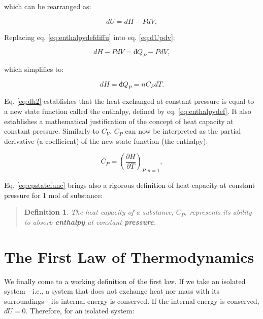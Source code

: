 \documentclass[
  9pt,
]{extbook}
\theoremstyle{definition}
\newtheorem{definition}{Definition}[chapter]
\theoremstyle{definition}
\theoremstyle{definition}
\theoremstyle{remark}
\begin{document}
which can be rearranged as:

\begin{equation}
  dU = dH -PdV,
  \label{eq:enthalpydefdiffu}
\end{equation}

Replacing eq. \eqref{eq:enthalpydefdiffu} into eq. \eqref{eq:dUpdv}:

\begin{equation}
  dH -PdV = đ Q_P - PdV,
  \label{eq:dh1}
\end{equation}

which simplifies to:

\begin{equation}
  dH = đ Q_P = n C_P dT.
  \label{eq:dh2}
\end{equation}

Eq. \eqref{eq:dh2} establishes that the heat exchanged at constant pressure is equal to a new state function called the enthalpy, defined by eq. \eqref{eq:enthalpydef}. It also establishes a mathematical justification of the concept of heat capacity at constant pressure. Similarly to \(C_V\), \(C_P\) can now be interpreted as the partial derivative (a coefficient) of the new state function (the enthalpy):

\begin{equation}
  C_P = \left( \frac{\partial H} {\partial T} \right)_{P,n=1},
  \label{eq:cpstatefunc}
\end{equation}

Eq. \eqref{eq:cpstatefunc} brings also a rigorous definition of heat capacity at constant pressure for 1 mol of substance:

\begin{quote}
\begin{definition}
\protect\hypertarget{def:newdefcp}{}{\label{def:newdefcp} }\emph{The heat capacity of a substance, \(C_P\), represents its ability to absorb \textbf{enthalpy} at constant \textbf{pressure}.}
\end{definition}
\end{quote}

\hypertarget{the-first-law-of-thermodynamics}{%
\section{The First Law of Thermodynamics}\label{the-first-law-of-thermodynamics}}

We finally come to a working definition of the first law. If we take an isolated system---i.e., a system that does not exchange heat nor mass with its surroundings---its internal energy is conserved. If the internal energy is conserved, \(dU=0\). Therefore, for an isolated system:
\end{document}
